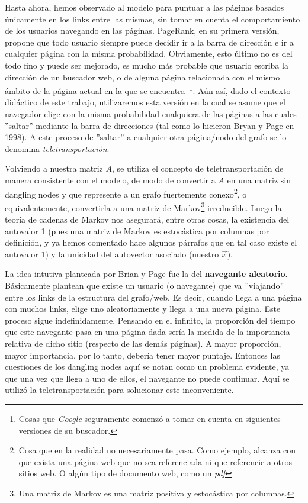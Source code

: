 \par Hasta ahora, hemos observado al modelo para puntuar a las p\'aginas basados
\'unicamente en los links entre las mismas, sin tomar en cuenta el
comportamiento de los usuarios navegando en las p\'aginas. PageRank, en su
primera versi\'on, propone que todo usuario siempre puede decidir ir a la barra
de direcci\'on e ir a cualquier p\'agina con la misma probabilidad. Obviamente,
esto \'ultimo no es del todo fino y puede ser mejorado, es mucho m\'as probable
que usuario escriba la direcci\'on de un buscador web, o de alguna p\'agina
relacionada con el mismo \'ambito de la p\'agina actual en la que se
encuentra~\footnote{Cosas que \emph{Google} seguramente comenz\'o a tomar en
cuenta en siguientes versiones de su buscador.}. A\'un as\'i, dado el contexto
did\'actico de este trabajo, utilizaremos esta versi\'on en la cual se asume que
el navegador elige con la misma probabilidad cualquiera de las p\'aginas a las
cuales ''saltar'' mediante la barra de direcciones (tal como lo hicieron Bryan y
Page en 1998).  A este proceso de ''saltar'' a cualquier otra p\'agina/nodo del
grafo se lo denomina \emph{teletransportaci\'on}.

\par Volviendo a nuestra matriz $A$, se utiliza el concepto de
teletransportaci\'on de manera consistente con el modelo, de modo de convertir
a $A$ en una matriz sin dangling nodes y que represente a un grafo fuertemente
conexo\footnote{Cosa que en la realidad no necesariamente pasa. Como ejemplo,
alcanza con que exista una p\'agina web que no sea referenciada ni que referencie
a otros sitios web. O alg\'un tipo de documento web, como un \emph{pdf}}, o
equivalentemente, convertirla a una matriz de Markov\footnote{Una matriz de
Markov es una matriz positiva y estoc\'astica por columnas.} irreducible. Luego
la teor\'ia de cadenas de Markov nos asegurar\'a, entre otras cosas, la
existencia del autovalor 1 (pues una matriz de Markov es estoc\'astica por
columnas por definici\'on, y ya hemos comentado hace algunos p\'arrafos que en
tal caso existe el autovalor 1) y la unicidad del autovector asociado (nuestro
$\vec{x}$).

\par La idea intutiva planteada por Brian y Page fue la del \textbf{navegante
aleatorio}. B\'asicamente plantean que existe un usuario (o navegante) que va
''viajando'' entre los links de la estructura del grafo/web. Es decir, cuando
llega a una p\'agina con muchos links, elige uno aleatoriamente y llega a una
nueva p\'agina. Este proceso sigue indefinidamente. Pensando en el infinito, la
proporci\'on del tiempo que este navegante pasa en una p\'agina dada ser\'ia la
medida de la importancia relativa de dicho sitio (respecto de las dem\'as
p\'aginas). A mayor proporci\'on, mayor importancia, por lo tanto, deber\'ia
tener mayor puntaje. Entonces las cuestiones de los dangling nodes aqu\'i se
notan como un problema evidente, ya que una vez que llega a uno de ellos, el
navegante no puede continuar. Aqu\'i se utiliz\'o la teletransportaci\'on para
solucionar este inconveniente.

